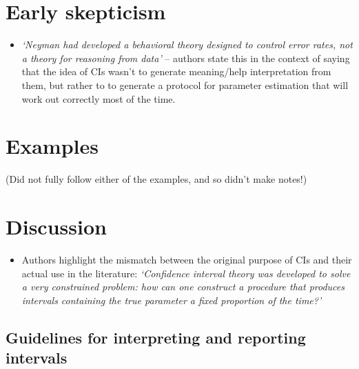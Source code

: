 \documentclass[
]{book}
\providecommand{\tightlist}{%
  \setlength{\itemsep}{0pt}\setlength{\parskip}{0pt}}
\begin{document}
\hypertarget{early-skepticism}{%
\section{Early skepticism}\label{early-skepticism}}

\begin{itemize}
\tightlist
\item
  \emph{`Neyman had developed a behavioral theory designed to control error
  rates, not a theory for reasoning from data'} -- authors state this in the context of saying that the idea of CIs wasn't to generate meaning/help interpretation from them, but rather to to generate a protocol for parameter estimation that will work out correctly most of the time.
\end{itemize}

\hypertarget{examples}{%
\section{Examples}\label{examples}}

(Did not fully follow either of the examples, and so didn't make notes!)

\hypertarget{discussion-7}{%
\section{Discussion}\label{discussion-7}}

\begin{itemize}
\tightlist
\item
  Authors highlight the mismatch between the original purpose of CIs and their actual use in the literature: \emph{`Confidence
  interval theory was developed to solve a very constrained
  problem: how can one construct a procedure that produces
  intervals containing the true parameter a fixed proportion
  of the time?'}
\end{itemize}

\hypertarget{guidelines-for-interpreting-and-reporting-intervals}{%
\subsection{Guidelines for interpreting and reporting intervals}\label{guidelines-for-interpreting-and-reporting-intervals}}
\end{document}
